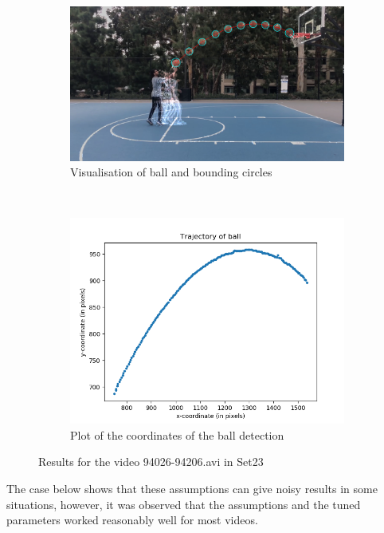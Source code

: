 \documentclass[12pt]{article}
\begin{document}
\begin{figure}[H]
    \centering
    \begin{subfigure}[b]{0.7\textwidth}
         \centering
         \includegraphics[width=\textwidth]{../results/visualisations/output_Set23_94026-94206.png}
         \caption{Visualisation of ball and bounding circles}
     \end{subfigure}\\
     \begin{subfigure}[b]{0.7\textwidth}
         \centering
         \includegraphics[width=\textwidth]{../results/plots/Set23_94026-94206.png}
         \caption{Plot of the coordinates of the ball detection}
     \end{subfigure}
     \caption{Results for the video 94026-94206.avi in Set23}
\end{figure}

The case below shows that these assumptions can give noisy results in some situations, however, it was observed that the assumptions and the tuned parameters worked reasonably well for most videos.
\end{document}
